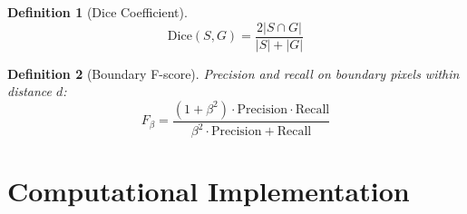 \documentclass[a4paper, 11pt]{article}
\newtheorem{definition}{Definition}[section]
\begin{document}
\begin{definition}[Dice Coefficient]
\begin{equation}
\text{Dice}(S, G) = \frac{2|S \cap G|}{|S| + |G|}
\end{equation}
\end{definition}

\begin{definition}[Boundary F-score]
Precision and recall on boundary pixels within distance $d$:
\begin{equation}
F_\beta = \frac{(1 + \beta^2) \cdot \text{Precision} \cdot \text{Recall}}{\beta^2 \cdot \text{Precision} + \text{Recall}}
\end{equation}
\end{definition}

\section{Computational Implementation}
\end{document}
